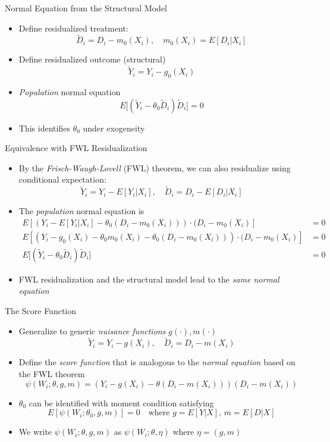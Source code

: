 \documentclass[aspectratio=1610,12pt,xcolor=dvipsnames]{beamer}
\begin{document}
\begin{frame}{Normal Equation from the Structural Model}

\begin{itemize}
    \item Define residualized treatment:
    \[
    \tilde D_i = D_i - m_0(X_i), \quad m_0(X_i)=E[D_i|X_i]
    \]
    \item Define residualized outcome (structural)
    \[
    \tilde Y_i = Y_i - g_0(X_i)
    \]
    \item \textit{Population} normal equation
    \[
    E\big[(\tilde Y_i - \theta_0 \tilde D_i)\tilde D_i\big] = 0
    \]
    \item This identifies $\theta_0$ under exogeneity
\end{itemize}
\end{frame}

\begin{frame}{Equivalence with FWL Residualization}

\begin{itemize}
    \item By the \textit{Frisch-Waugh-Lovell} (FWL) theorem, we can also residualize using conditional expectation:
    \[
    \tilde Y_i = Y_i - E[Y_i|X_i], 
    \quad \tilde D_i = D_i - E[D_i|X_i]
    \]
    \item The \textit{population} normal equation is
    \begin{align*}
      E[(Y_i - E[Y_i|X_i] - \theta_0(D_i -m_0(X_i)))\cdot (D_i -m_0(X_i)] &= 0 \\
      E[(Y_i - g_0(X_i) - \theta_0m_0(X_i) - \theta_0(D_i -m_0(X_i)))\cdot (D_i -m_0(X_i)] &= 0 \\
      E\big[(\tilde Y_i - \theta_0 \tilde D_i)\tilde D_i\big] &= 0
    \end{align*}
    \item FWL residualization and the structural model lead to the \textit{same normal equation}
\end{itemize}
\end{frame}

\begin{frame}{The Score Function}

\begin{itemize}
    \item Generalize to generic \textit{nuisance functions} $g(\cdot), m(\cdot)$
    \[
    \tilde Y_i = Y_i - g(X_i), 
    \quad \tilde D_i = D_i - m(X_i)
    \]
    \item Define the \textit{score function} that is analogous to the \textit{normal equation} based on the FWL theorem
    \[
    \psi(W_i; \theta, g, m) = 
    (Y_i - g(X_i) - \theta(D_i - m(X_i)))(D_i - m(X_i))
    \]
    \item $\theta_0$ can be identified with moment condition satisfying
    \[
    E[\psi(W_i; \theta_0, g, m)] = 0
    \quad \text{where } g=E[Y|X],\, m=E[D|X]
    \]
    \item We write $\psi(W_i; \theta, g, m)$ as $\psi(W_i; \theta, \eta)$ where $\eta = (g,m)$ 
\end{itemize}
\end{frame}
\end{document}
